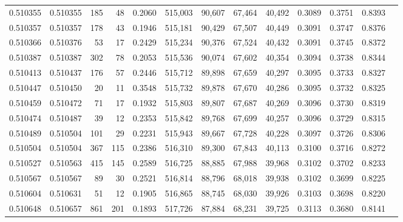 \begin{tabular}{rrrrrrrrrrrrr}
0.510355 & 0.510355 &   185 &    48 &                                     0.2060 & 515,003 &  90,607 &  67,464 &  40,492 & 0.3089 & 0.3751 & 0.8393 \\
0.510357 & 0.510357 &   178 &    43 &                                     0.1946 & 515,181 &  90,429 &  67,507 &  40,449 & 0.3091 & 0.3747 & 0.8376 \\
0.510366 & 0.510376 &    53 &    17 &                                     0.2429 & 515,234 &  90,376 &  67,524 &  40,432 & 0.3091 & 0.3745 & 0.8372 \\
0.510387 & 0.510387 &   302 &    78 &                                     0.2053 & 515,536 &  90,074 &  67,602 &  40,354 & 0.3094 & 0.3738 & 0.8344 \\
0.510413 & 0.510437 &   176 &    57 &                                     0.2446 & 515,712 &  89,898 &  67,659 &  40,297 & 0.3095 & 0.3733 & 0.8327 \\
0.510447 & 0.510450 &    20 &    11 &                                     0.3548 & 515,732 &  89,878 &  67,670 &  40,286 & 0.3095 & 0.3732 & 0.8325 \\
0.510459 & 0.510472 &    71 &    17 &                                     0.1932 & 515,803 &  89,807 &  67,687 &  40,269 & 0.3096 & 0.3730 & 0.8319 \\
0.510474 & 0.510487 &    39 &    12 &                                     0.2353 & 515,842 &  89,768 &  67,699 &  40,257 & 0.3096 & 0.3729 & 0.8315 \\
0.510489 & 0.510504 &   101 &    29 &                                     0.2231 & 515,943 &  89,667 &  67,728 &  40,228 & 0.3097 & 0.3726 & 0.8306 \\
0.510504 & 0.510504 &   367 &   115 &                                     0.2386 & 516,310 &  89,300 &  67,843 &  40,113 & 0.3100 & 0.3716 & 0.8272 \\
0.510527 & 0.510563 &   415 &   145 &                                     0.2589 & 516,725 &  88,885 &  67,988 &  39,968 & 0.3102 & 0.3702 & 0.8233 \\
0.510567 & 0.510567 &    89 &    30 &                                     0.2521 & 516,814 &  88,796 &  68,018 &  39,938 & 0.3102 & 0.3699 & 0.8225 \\
0.510604 & 0.510631 &    51 &    12 &                                     0.1905 & 516,865 &  88,745 &  68,030 &  39,926 & 0.3103 & 0.3698 & 0.8220 \\
0.510648 & 0.510657 &   861 &   201 &                                     0.1893 & 517,726 &  87,884 &  68,231 &  39,725 & 0.3113 & 0.3680 & 0.8141 \\

\end{tabular}
